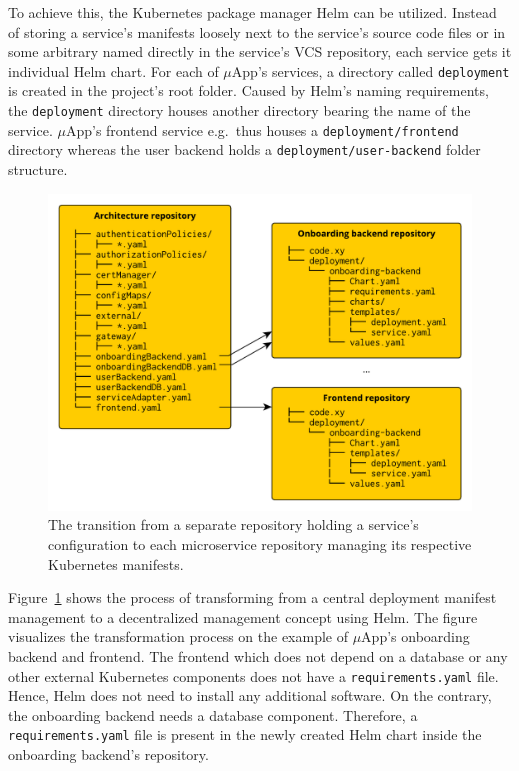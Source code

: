 To achieve this, the Kubernetes package manager Helm can be utilized. Instead
of storing a service's manifests loosely next to the service's source code
files or in some arbitrary named directly in the service's \ac{VCS} repository,
each service gets it individual Helm chart. For each of $\mu$App's services, a
directory called \texttt{deployment} is created in the project's root folder.
Caused by Helm's naming requirements, the \texttt{deployment} directory houses
another directory bearing the name of the service. $\mu$App's frontend service
e.g.\ thus houses a \texttt{deployment/frontend} directory whereas the user
backend holds a \texttt{deployment/user-backend} folder structure.

\begin{figure}[H]
\begin{center}
  \includegraphics[scale=0.7]{images/figures/helmification_process.pdf}
\end{center}
\caption{The transition from a separate repository holding a service's
configuration to each microservice repository managing its respective
Kubernetes manifests.}%
\label{fig:helmification_process}
\end{figure}

Figure~\ref{fig:helmification_process} shows the process of transforming from a
central deployment manifest management to a decentralized management concept
using Helm. The figure visualizes the transformation process on the example of
$\mu$App's onboarding backend and frontend. The frontend which does not depend
on a database or any other external Kubernetes components does not have a
\texttt{requirements.yaml} file. Hence, Helm does not need to install any
additional software. On the contrary, the onboarding backend needs a database
component. Therefore, a \texttt{requirements.yaml} file is present in the newly
created Helm chart inside the onboarding backend's repository.

